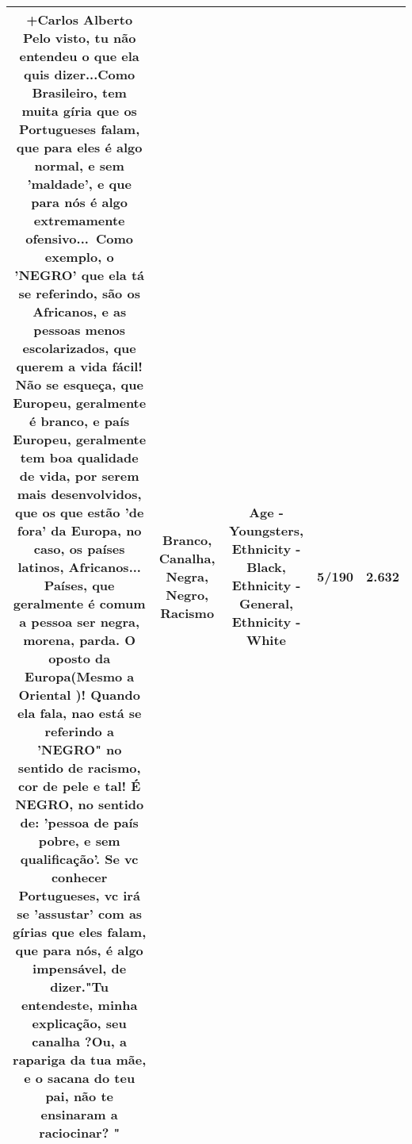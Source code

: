 \documentclass[11pt]{article}
\newlength\mylength
\begin{document}
\begin{center}
\begin{longtable}{|C{.65\mylength}|C{.30\mylength}|C{.12\mylength}|C{.12\mylength}|C{.12\mylength}|}
  \small +Carlos Alberto Pelo visto, tu não entendeu o que ela quis dizer...Como Brasileiro, tem muita gíria que os Portugueses falam, que para eles é algo normal, e sem 'maldade', e que para nós é algo extremamente ofensivo... Como exemplo, o '\textbf{NEGRO}' que ela tá se referindo, são os Africanos, e as  pessoas menos escolarizados, que querem a vida fácil! Não se esqueça, que Europeu, geralmente é \textbf{branco}, e país Europeu, geralmente tem boa qualidade de vida, por serem mais desenvolvidos, que os que estão 'de fora' da Europa, no caso, os países latinos, Africanos... Países, que geralmente é comum a pessoa ser \textbf{negra}, morena, parda. O oposto da Europa(Mesmo a Oriental )! Quando ela fala, nao está se referindo a '\textbf{NEGRO}" no sentido de \textbf{racismo}, cor de pele e tal! É \textbf{NEGRO}, no sentido de: 'pessoa de país pobre, e sem qualificação'. Se vc conhecer Portugueses, vc irá se 'assustar' com as gírias que eles falam, que para nós, é algo impensável, de dizer."Tu entendeste, minha explicação, seu \textbf{canalha} ?Ou, a rapariga da tua mãe, e o sacana do teu pai, não te ensinaram a raciocinar? "\normalsize   & Branco, Canalha, Negra, Negro, Racismo & Age - Youngsters, Ethnicity - Black, Ethnicity - General, Ethnicity - White & 5/190 & 2.632 \\  \hline

\end{longtable}
\end{center}
\end{document}
